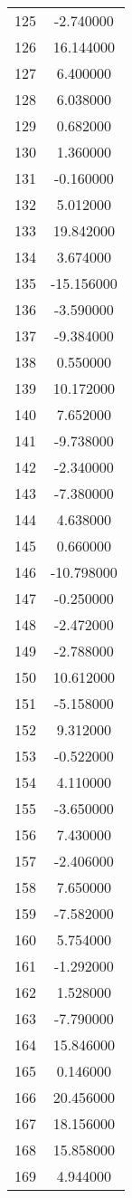 \documentclass[12pt]{article}
\begin{document}
\begin{longtable}{@{}cc@{}}
125 & -2.740000 \\
126 & 16.144000 \\
127 & 6.400000 \\
128 & 6.038000 \\
129 & 0.682000 \\
130 & 1.360000 \\
131 & -0.160000 \\
132 & 5.012000 \\
133 & 19.842000 \\
134 & 3.674000 \\
135 & -15.156000 \\
136 & -3.590000 \\
137 & -9.384000 \\
138 & 0.550000 \\
139 & 10.172000 \\
140 & 7.652000 \\
141 & -9.738000 \\
142 & -2.340000 \\
143 & -7.380000 \\
144 & 4.638000 \\
145 & 0.660000 \\
146 & -10.798000 \\
147 & -0.250000 \\
148 & -2.472000 \\
149 & -2.788000 \\
150 & 10.612000 \\
151 & -5.158000 \\
152 & 9.312000 \\
153 & -0.522000 \\
154 & 4.110000 \\
155 & -3.650000 \\
156 & 7.430000 \\
157 & -2.406000 \\
158 & 7.650000 \\
159 & -7.582000 \\
160 & 5.754000 \\
161 & -1.292000 \\
162 & 1.528000 \\
163 & -7.790000 \\
164 & 15.846000 \\
165 & 0.146000 \\
166 & 20.456000 \\
167 & 18.156000 \\
168 & 15.858000 \\
169 & 4.944000 \\

\end{longtable}
\end{document}
